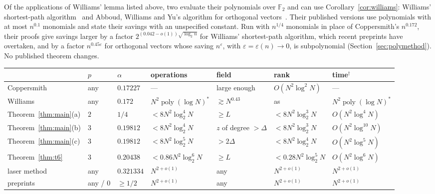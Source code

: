 \documentclass[11pt]{article}
\theoremstyle{definition}
\theoremstyle{remark}
\newcommand{\F}{\mathbb{F}}
\newcommand{\eps}{\varepsilon}
\DeclareMathOperator{\poly}{poly}
\begin{document}
Of the applications of Williams' lemma listed above, two evaluate their polynomials over $\F_2$ and can use Corollary~\ref{cor:williams}: Williams' shortest-path algorithm~\cite{Wil14a} and Abboud, Williams and Yu's algorithm for orthogonal vectors~\cite{AWY15}. Their published versions use polynomials with at most $n^{0.1}$ monomials and state their savings with an unspecified constant. Run with $n^{1/4}$ monomials in place of Coppersmith's $n^{0.172}$, their proofs give savings larger by a factor $2^{(0.042-o(1))\sqrt{\log_2n}}$ for Williams' shortest-path algorithm, which recent preprints have overtaken, and by a factor $n^{0.45\eps}$ for orthogonal vectors whose saving $n^\eps$, with $\eps=\eps(n)\to0$, is subpolynomial (Section~\ref{sec:polymethod}). No published theorem changes.

\begin{table}[t]
\centering\footnotesize
\renewcommand{\arraystretch}{1.2}\setlength{\tabcolsep}{2.8pt}
\begin{tabular}{@{}lllllll@{}}
\toprule
 & $p$ & $\alpha$ & operations & field & rank & time$^\dagger$\\
\midrule
Coppersmith~\cite{Cop82} & any & $0.17227$ & --- & large enough & $O(N^2\log^2N)$ & ---\\
Williams~\cite[L.~2.3]{Wil14b} & any & $0.172$ & $N^2\poly(\log N)^*$ & $\gtrsim N^{0.43}$ & as~\cite{Cop82} & $N^2\poly(\log N)^*$\\
Theorem~\ref{thm:main}(a) & $2$ & $1/4$ & $<8N^2\log_2^4N$ & $\ge L$ & $<8N^2\log_2^3N$ & $O(N^2\log^4N)$\\
Theorem~\ref{thm:main}(b) & $3$ & $0.19812$ & $<8N^2\log_2^4N$ & $z$ of degree $>\Delta$ & $<8N^2\log_2^3N$ & $O(N^2\log^{10}N)$\\
Theorem~\ref{thm:main}(c) & $3$ & $0.19812$ & $<8N^2\log_2^5N$ & $>2\Delta$ & $<8N^2\log_2^4N$ & $O(N^2\log^5N)$\\
Theorem~\ref{thm:t6} & $3$ & $0.20438$ & $<0.86N^2\log_2^6N$ & $\ge L$ & $<0.28N^2\log_2^5N$ & $O(N^2\log^6N)$\\
\midrule
laser method~\cite{VXXZ24} & any & $0.321334$ & $N^{2+o(1)}$ & any & $N^{2+o(1)}$ & $N^{2+o(1)}$\\
preprints~\cite{AvBZ26,Uzn26} & any / $0$ & $\ge1/2$ & $N^{2+o(1)}$ & any & $N^{2+o(1)}$ & $N^{2+o(1)}$\\
\bottomrule
\end{tabular}

\end{table}
\end{document}
